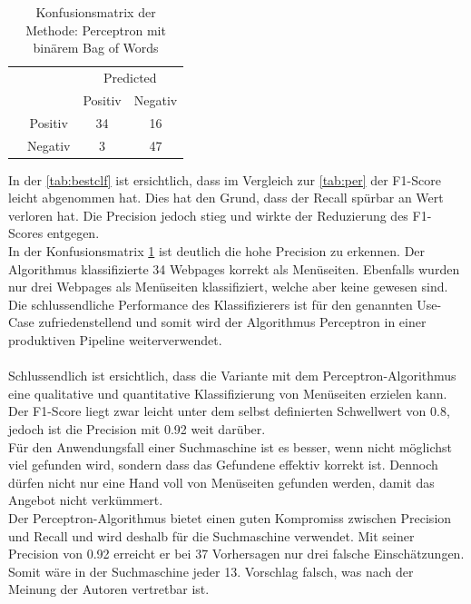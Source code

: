 \begin{table}[H]
	\caption{Konfusionsmatrix der Methode: Perceptron mit binärem Bag of Words}
	\centering
	\label{tab:conf}
	\begin{tabular}{@{}cc|cc@{}}
		\multicolumn{1}{c}{} &\multicolumn{1}{c}{} &\multicolumn{2}{c}{Predicted} \\ 
		\multicolumn{1}{c}{} & 
		\multicolumn{1}{c|}{} & 
		\multicolumn{1}{c}{Positiv} & 
		\multicolumn{1}{c}{Negativ} \\ 
		\cline{2-4}
		\multirow[c]{2}{*}{\rotatebox[origin=tr]{90}{Actual}}
		& Positiv  & 34   & 16   \\[1.5ex]
		& Negativ  & 3   & 47 \\ 
		\cline{2-4}
	\end{tabular}
\end{table}
In der \cref{tab:bestclf} ist ersichtlich, dass im Vergleich zur \cref{tab:per} der F1-Score leicht abgenommen hat.
Dies hat den Grund, dass der Recall spürbar an Wert verloren hat.
Die Precision jedoch stieg und wirkte der Reduzierung des F1-Scores entgegen.\\
In der Konfusionsmatrix \cref{tab:conf} ist deutlich die hohe Precision zu erkennen.
Der Algorithmus klassifizierte 34 Webpages korrekt als Menüseiten.
Ebenfalls wurden nur drei Webpages als Menüseiten klassifiziert, welche aber keine gewesen sind.
Die schlussendliche Performance des Klassifizierers ist für den genannten \glqq Use-Case\grqq{} zufriedenstellend und somit wird der Algorithmus Perceptron in einer produktiven Pipeline weiterverwendet.
\\\\
Schlussendlich ist ersichtlich, dass die Variante mit dem Perceptron-Algorithmus eine qualitative und quantitative Klassifizierung von Menüseiten erzielen kann.
Der F1-Score liegt zwar leicht unter dem selbst definierten Schwellwert von 0.8, jedoch ist die Precision mit 0.92 weit darüber.\\

Für den Anwendungsfall einer Suchmaschine ist es besser, wenn nicht möglichst viel gefunden wird, sondern dass das Gefundene effektiv korrekt ist.
Dennoch dürfen nicht nur eine Hand voll von Menüseiten gefunden werden, damit das Angebot nicht verkümmert.\\
Der Perceptron-Algorithmus bietet einen guten Kompromiss zwischen Precision und Recall und wird deshalb für die Suchmaschine verwendet.
Mit seiner Precision von 0.92 erreicht er bei 37 Vorhersagen nur drei falsche Einschätzungen.
Somit wäre in der Suchmaschine jeder 13. Vorschlag falsch, was nach der Meinung der Autoren vertretbar ist.
